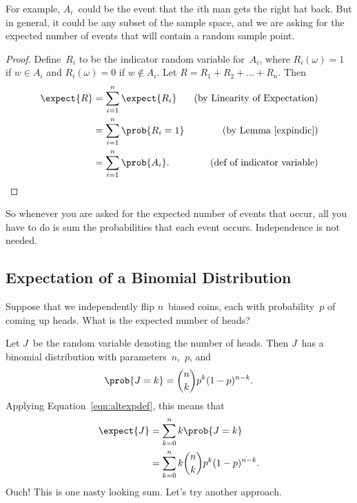 For example, $A_i$~could be the event that the $i$th man gets the
right hat back.  But in general, it could be any subset of the sample
space, and we are asking for the expected number of events that will
contain a random sample point.

\begin{proof}

Define~$R_i$ to be the indicator random variable for~$A_i$, where
$R_i(\omega) = 1$ if $w \in A_i$ and $R_i(\omega) = 0$ if $w \notin A_i$.  Let
$R = R_1 + R_2 + \dots + R_n$.  Then
\begin{align*}
\expect{R}
    &= \sum_{i = 1}^n \expect{R_i}
    & \text{(by Linearity of Expectation)}\\
%
    &= \sum_{i = 1}^n \prob{R_i = 1}
    & \text{(by Lemma~\ref{expindic})}\\
%
%
    &= \sum_{i = 1}^n \prob{A_i}. \qedhere  
        & \text{(def of indicator variable)}\\
\end{align*}
\end{proof}

So whenever you are asked for the expected number of events that occur,
all you have to do is sum the probabilities that each event occurs.
Independence is not needed.

\subsection{Expectation of a Binomial Distribution}

Suppose that we independently flip $n$~biased coins, each with
probability~$p$ of coming up heads.  What is the expected number of
heads?

Let $J$~be the random variable denoting the number of heads.  Then
$J$~has a binomial distribution with parameters~$n$,~$p$, and
\begin{equation*}
    \prob{J = k} = \binom{n}{k} p^k (1 - p)^{n - k}.
\end{equation*}
Applying Equation~\ref{eqn:altexpdef}, this means that
\begin{align}
\expect{J}
    &= \sum_{k = 0}^n k \prob{J = k} \notag\\
    &= \sum_{k = 0}^n k \binom{n}{k} p^k (1 - p)^{n - k}. \label{eqn:17T7}
\end{align}
Ouch!  This is one nasty looking sum.  Let's try another approach.

